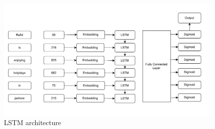 \begin{figure}[ht!]
  \includegraphics[width=\linewidth]{chapters/LSTM.png}
  \caption{LSTM architecture}
\end{figure}

